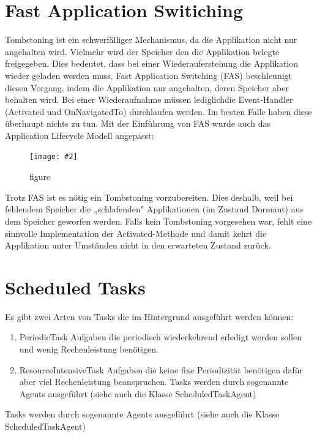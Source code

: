 \documentclass[a4paper,10pt]{scrreprt}
\newcommand{\pic}[2][figure]{\begin{figure}[h]
 \centering
 \texttt{[image: \#2]}
 \caption{#1}
\end{figure}
}
\begin{document}
\section{Fast Application Switiching}
Tombstoning ist ein schwerfälliger Mechanismus, da die Applikation nicht nur angehalten wird. Vielmehr wird
der Speicher den die Applikation belegte freigegeben. Dies bedeutet, dass bei einer Wiederauferstehung die
Applikation wieder geladen werden muss. Fast Application Switching (FAS) beschleunigt diesen Vorgang, indem
die Applikation nur angehalten, deren Speicher aber behalten wird. Bei einer Wiederaufnahme müssen lediglichdie 
Event-Handler (Activated und 
OnNavigatedTo) durchlaufen werden. Im besten Falle haben diese überhaupt
nichts zu tun. Mit der Einführung von FAS wurde auch das Application Lifecycle Modell angepasst:
\pic{modl.png}
Trotz FAS ist es nötig ein Tombstoning vorzubereiten. Dies deshalb, weil bei fehlendem Speicher die
„schlafenden" Applikationen (im Zustand Dormant) aus dem Speicher geworfen werden. Falls kein Tombstoning
vorgesehen war, fehlt eine sinnvolle Implementation der Activated-Methode und damit kehrt die Applikation
unter Umständen nicht in den erwarteten Zustand zurück.

\section{Scheduled Tasks}
Es gibt zwei Arten von Tasks die im Hintergrund ausgeführt werden können:
\begin{enumerate}
\item  PeriodicTask
Aufgaben die periodisch wiederkehrend erledigt werden sollen und wenig Rechenleistung benötigen.
\item ResourceIntensiveTask
Aufgaben die keine fixe Periodizität benötigen dafür aber viel Rechenleistung beanspruchen.
Tasks werden durch sogenannte Agents ausgeführt (siehe auch die Klasse ScheduledTaskAgent)
\end{enumerate}
Tasks werden durch sogenannte Agents ausgeführt (siehe auch die Klasse ScheduledTaskAgent)
\end{document}
